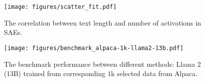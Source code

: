 \begin{figure}[h]
\centering
\texttt{[image: figures/scatter\_fit.pdf]}
\caption{The correlation between text length and number of activations in SAEs.}\label{fig: correlation}
\end{figure} 

\begin{figure*}[ht]
\centering
\texttt{[image: figures/benchmark\_alpaca-1k-llama2-13b.pdf]}
\caption{The benchmark performance between different methods: Llama 2 (13B) trained from corresponding $1$k selected data from Alpaca.}\label{fig: benchmark_wizardlm-llama2-13b}
\end{figure*} 




